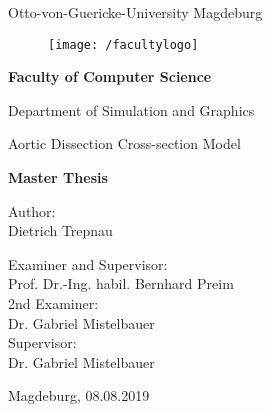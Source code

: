 \documentclass[thesis.tex]{subfiles}
\begin{document}
\thispagestyle {empty}

\begin{center}
\begin{Large}
Otto-von-Guericke-University Magdeburg\\

\begin{figure}
	\centering
	\texttt{[image: /facultylogo]}
	\label{fig:logoinffak}
\end{figure}

\vspace{3mm}

\textbf{Faculty of Computer Science}\\
\end{Large}

\vspace{3mm}

Department of Simulation and Graphics\\

\vspace{1cm}
\begin{Huge}
Aortic Dissection Cross-section Model\\
\end{Huge}
\vspace{15mm}
{\Huge \textbf{Master Thesis}}\\
\vspace{15mm}

Author:\\
\vspace{4mm}
{\huge Dietrich Trepnau}\\

\vspace{16mm}

Examiner and Supervisor:\\
\vspace{2mm}
{\Large Prof. Dr.-Ing. habil. Bernhard Preim}\\
\vspace{4mm}
2nd Examiner:\\
\vspace{2mm}
{\Large Dr. Gabriel Mistelbauer}\\
\vspace{10mm}
Supervisor:\\
\vspace{2mm}
{\large Dr. Gabriel Mistelbauer}\\


\vspace{25mm}

{\large Magdeburg, 08.08.2019}\\

\vspace{40mm}

\end{center}
\clearpage
\end{document}

